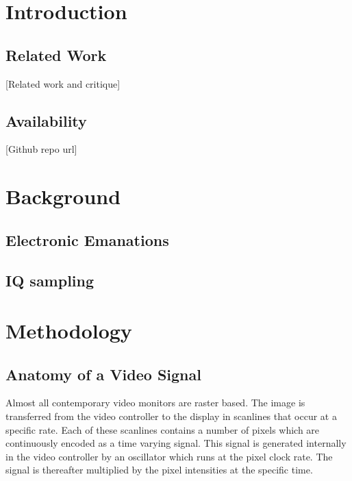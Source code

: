 \documentclass[a4paper,12pt,twoside,openright]{report}
\begin{document}
\pagestyle{empty}
\singlespacing

\onehalfspacing

\singlespacing


\setcounter{page}{0}
\pagestyle{plain}
\tableofcontents

\onehalfspacing


\chapter{Introduction}
\setcounter{page}{1} 

\section{Related Work} 

[Related work and critique]

\section{Availability} 
[Github repo url]

\cite{kuhn2003compromising}

\chapter{Background}

\section{Electronic Emanations} 

\section{IQ sampling} 

\chapter{Methodology} 

\section{Anatomy of a Video Signal}

Almost all contemporary video monitors are raster based. The image is transferred from the video controller to the display in scanlines that occur at a specific rate. Each of these scanlines contains a number of pixels which are continuously encoded as a time varying signal. This signal is generated internally in the video controller by an oscillator which runs at the pixel clock rate. The signal is thereafter multiplied by the pixel intensities at the specific time.
\end{document}
